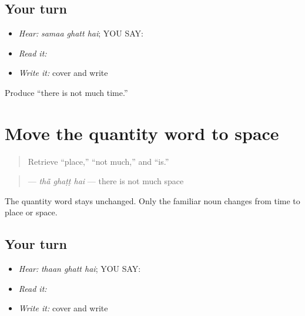 \subsection*{Your turn}
\begin{itemize}
\raggedright
  \item \emph{Hear:} \emph{samaa ghatt hai}; YOU SAY: \textbf{  }
  \item \emph{Read it:} \textbf{  }
  \item \emph{Write it:} cover and write \textbf{  }
\end{itemize}

\begin{tcolorbox}[breakable,colback=teal!4,colframe=teal!35!black,title={Before you move on}]
Produce “there is not much time.”
\end{tcolorbox}
\section[\texorpdfstring{\pa{ਥਾਂ} \pa{ਘੱਟ} \pa{ਹੈ} (thaan ghatt hai)}{ਥਾਂ ਘੱਟ ਹੈ (thaan ghatt hai)}]{Move the quantity word to space}

\label{lesson:PA-C191-thaan-ghatt}



\begin{quote}
Retrieve “place,” “not much,” and “is.”
\end{quote}

\begin{grammarlens}[title={Grammar Lens: second familiar noun}]
\begin{quote}
\textbf{  } — \emph{thā̃ ghaṭṭ hai} — there is not much space
\end{quote}

The quantity word stays unchanged. Only the familiar noun changes from time to place or space.
\end{grammarlens}

\subsection*{Your turn}
\begin{itemize}
\raggedright
  \item \emph{Hear:} \emph{thaan ghatt hai}; YOU SAY: \textbf{  }
  \item \emph{Read it:} \textbf{  }
  \item \emph{Write it:} cover and write \textbf{  }
\end{itemize}

